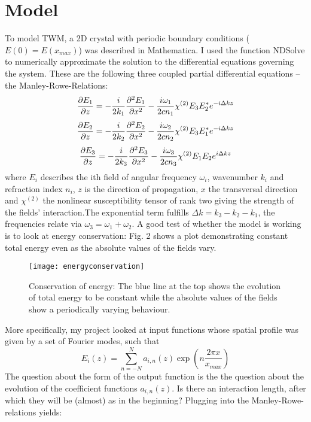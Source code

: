 \documentclass{article}
\begin{document}
\section{Model}
To model TWM, a 2D crystal with periodic boundary conditions  ($E(0)=E(x_{max})$) was described in Mathematica. I used the function NDSolve to numerically approximate the solution to the differential equations governing the system. These are the following three coupled partial differential equations -- the Manley-Rowe-Relations:
 \begin{equation}
\frac{\partial E_1} {\partial z}=-\frac{i}{2k_1} \pdv [2]{E_1}{x}-\frac{i \omega_1}{2 c n_1} \chi^{(2)}E_3 E_2^*e^{-i\Delta k z}
\end{equation}
\begin{equation}
\frac{\partial E_2} {\partial z}=-\frac{i}{2k_2} \pdv [2]{E_2}{x}-\frac{i \omega_2}{2 c n_2} \chi^{(2)}E_3 E_1^*e^{-i\Delta k z}
\end{equation}
\begin{equation}
\frac{\partial E_3} {\partial z}=-\frac{i}{2k_3} \pdv [2]{E_3}{x}-\frac{i \omega_3}{2 c n_3} \chi^{(2)}E_1 E_2 e^{i\Delta k z}
\end{equation}
where $E_i$ describes the ith field of angular frequency $\omega_i$, wavenumber $k_i$ and refraction index $n_i$, $z$ is the direction of propagation, $x$ the transversal direction and $\chi^{(2)}$ the nonlinear susceptibility tensor of rank two giving the strength of the fields' interaction.The exponential term fulfills $\Delta k= k_3-k_2-k_1$, the frequencies relate via $\omega_3=\omega_1+\omega_2$. A good test of whether the model is working is to look at energy conservation: Fig. 2 shows a plot demonstrating constant total energy even as the absolute values of the fields vary. 
\begin{figure}[h]
\texttt{[image: energyconservation]}
\caption{Conservation of energy: The blue line at the top shows the evolution of total energy to be constant while the absolute values of the fields show a periodically varying behaviour.}
\end{figure}
More specifically, my project looked at input functions whose spatial profile was given by a set of Fourier modes, such that
$$E_i(z)= \sum_{n=-N}^{N} a_{i,n}(z) \exp(n \frac{2\pi x}{x_{max}})$$
The question about the form of the output function is the the question about the evolution of the coefficient functions $a_{i,n}(z)$. Is there an interaction length, after which they will be (almost) as in the beginning? Plugging into the Manley-Rowe-relations yields: 
\end{document}
